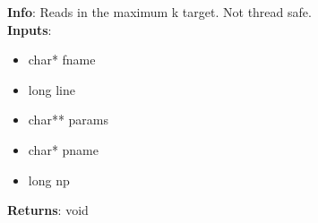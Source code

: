 \textbf{Info}: Reads in the maximum k target. Not thread safe. \\

\noindent \textbf{Inputs}:
\begin{itemize}
\item{char* fname}
\item{long line}
\item{char** params}
\item{char* pname}
\item{long np}
\end{itemize}

\noindent \textbf{Returns}: void
